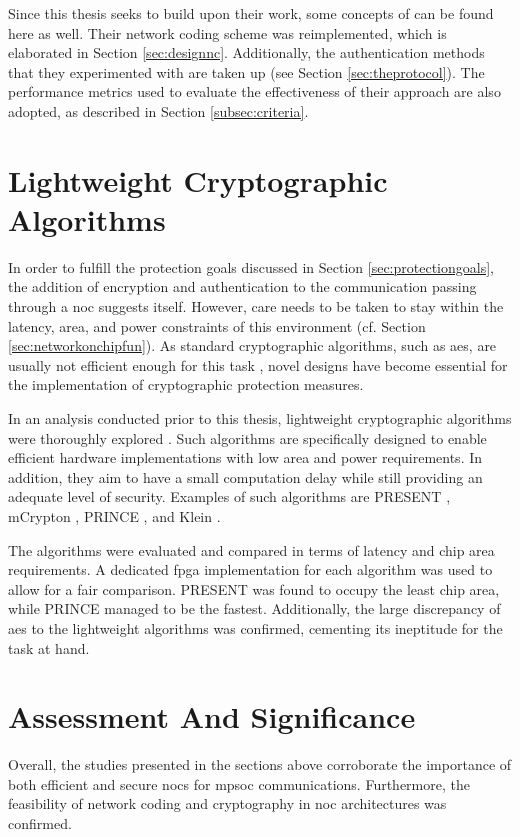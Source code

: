 Since this thesis seeks to build upon their work, some concepts of \citeauthor{moriam18activeattackers} can be found here as well. Their network coding
scheme was reimplemented, which is elaborated in Section \ref{sec:designnc}. Additionally, the authentication methods that they experimented with
are taken up (see Section \ref{sec:theprotocol}). The performance metrics used to evaluate the effectiveness of their approach are also adopted, as
described in Section \ref{subsec:criteria}.

\section{Lightweight Cryptographic Algorithms}\label{sec:lightweightcrypto}
In order to fulfill the protection goals discussed in Section \ref{sec:protectiongoals}, the addition of encryption and authentication to
the communication passing through a \gls{noc} suggests itself. However, care needs to be taken to stay within the latency, area, and power constraints
of this environment (cf. Section \ref{sec:networkonchipfun}). As standard cryptographic algorithms, such as \gls{aes}, are usually not efficient
enough for this task \cite[1]{bogdanov07present}, novel designs have become essential for the implementation of cryptographic protection measures.

In an analysis conducted prior to this thesis, lightweight cryptographic algorithms were thoroughly explored \cite{harttung17lightweightcrypto}. Such
algorithms are
specifically designed to enable efficient hardware implementations with low area and power requirements. In addition, they aim to have a small
computation delay while still providing an adequate level of security. Examples of such algorithms are PRESENT \cite{bogdanov07present},
mCrypton \cite{lim06mcrypton}, PRINCE \cite{borghoff12prince}, and Klein \cite{gong12klein}.

The algorithms were evaluated and compared in terms of latency and chip area requirements. A dedicated \gls{fpga} implementation for each algorithm
was used to allow for a fair comparison. PRESENT was found to occupy the least chip area, while PRINCE managed to be the fastest.
Additionally, the large discrepancy of \gls{aes} to the lightweight algorithms was confirmed, cementing its ineptitude for the task at hand.

\section{Assessment And Significance}\label{sec:assandsig}
Overall, the studies presented in the sections above corroborate the importance of both efficient and secure \glspl{noc} for \gls{mpsoc}
communications. Furthermore, the feasibility of network coding and cryptography in \gls{noc} architectures was confirmed.

